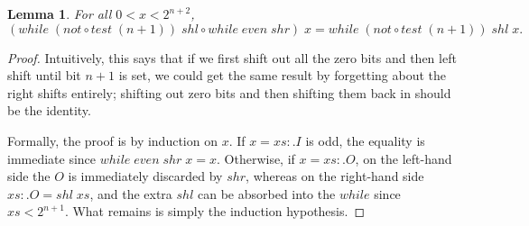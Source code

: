 \documentclass{jfp}
\newcommand{\Conid}[1]{\mathit{#1}}
\newcommand{\Varid}[1]{\mathit{#1}}
\newenvironment{sproof}{%
    \begin{tabbing}
    \phantom{$\equiv$} \= \qquad\qquad\qquad\qquad\qquad \= \kill
}{
    \end{tabbing}
}
\newcommand{\stmt}[1]{\> \ensuremath{#1} \\}
\newcommand{\reason}[2]{\ensuremath{#1} \>\> \{ \quad #2 \quad \} \\}
\newtheorem{lem}[thm]{Lemma}
\theoremstyle{definition}
\theoremstyle{remark}
\begin{document}
\begin{lem} \label{lem:shlshr}
  For all $0 < x < 2^{n+2}$,
  \[ \ensuremath{(\Varid{while}\;(not\mathbin{\circ}\Varid{test}\;(\Varid{n}\mathbin{+}\mathrm{1}))\;\Varid{shl}\mathbin{\circ}\Varid{while}\;\Varid{even}\;\Varid{shr})\;\Varid{x}\mathrel{=}\Varid{while}\;(not\mathbin{\circ}\Varid{test}\;(\Varid{n}\mathbin{+}\mathrm{1}))\;\Varid{shl}\;\Varid{x}}. \]
\end{lem}
\begin{proof}
  Intuitively, this says that if we first shift out all the zero bits
  and then left shift until bit $n+1$ is set, we could get the same
  result by forgetting about the right shifts entirely; shifting out
  zero bits and then shifting them back in should be the identity.

  Formally, the proof is by induction on \ensuremath{\Varid{x}}.  If \ensuremath{\Varid{x}\mathrel{=}\Varid{xs}\mathrel{:\!.}\Conid{I}} is odd, the equality is
  immediate since \ensuremath{\Varid{while}\;\Varid{even}\;\Varid{shr}\;\Varid{x}\mathrel{=}\Varid{x}}. Otherwise, if \ensuremath{\Varid{x}\mathrel{=}\Varid{xs}\mathrel{:\!.}\Conid{O}},
  on the left-hand side the \ensuremath{\Conid{O}} is immediately discarded by \ensuremath{\Varid{shr}},
  whereas on the right-hand side \ensuremath{\Varid{xs}\mathrel{:\!.}\Conid{O}\mathrel{=}\Varid{shl}\;\Varid{xs}}, and the extra
  \ensuremath{\Varid{shl}} can be absorbed into the \ensuremath{\Varid{while}} since $\ensuremath{\Varid{xs}} < 2^{n+1}$.  What
  remains is simply the induction hypothesis.
\end{proof}
\end{document}
